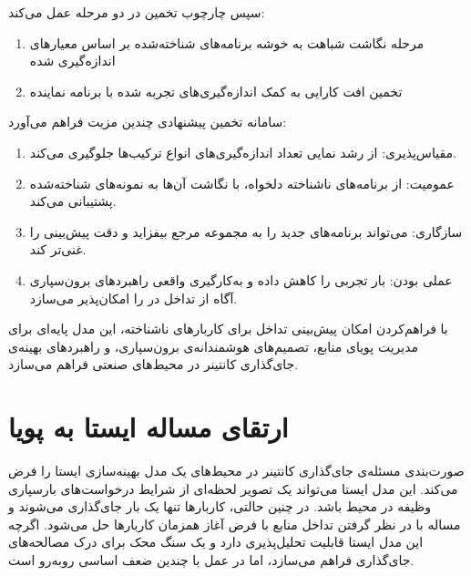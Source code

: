 سپس چارچوب تخمین در دو مرحله عمل می‌کند:

\begin{enumerate}
\item
مرحله نگاشت شباهت به خوشه برنامه‌های شناخته‌شده بر اساس معیارهای اندازه‌گیری شده

\item
تخمین افت کارایی به کمک اندازه‌گیری‌های تجربه شده با برنامه نماینده
\end{enumerate}

سامانه تخمین پیشنهادی چندین مزیت فراهم می‌آورد:

\begin{enumerate}
\item
مقیاس‌پذیری: از رشد نمایی تعداد اندازه‌گیری‌های انواع ترکیب‌ها جلوگیری می‌کند.

\item
عمومیت: از برنامه‌های ناشناخته دلخواه، با نگاشت آن‌ها به نمونه‌های شناخته‌شده پشتیبانی می‌کند.

\item
سازگاری: می‌تواند برنامه‌های جدید را به مجموعه مرجع بیفزاید و دقت پیش‌بینی را غنی‌تر کند.

\item
عملی بودن: بار تجربی را کاهش داده و به‌کارگیری واقعی راهبردهای برون‌سپاری آگاه از تداخل در  را امکان‌پذیر می‌سازد.
\end{enumerate}

با فراهم‌کردن امکان پیش‌بینی تداخل برای کاربارهای ناشناخته، این مدل پایه‌ای برای مدیریت پویای منابع، تصمیم‌های هوشمندانه‌ی برون‌سپاری، و راهبردهای بهینه‌ی جای‌گذاری کانتینر در محیط‌های صنعتی  فراهم می‌سازد.

\section{ارتقای مساله ایستا به پویا}

صورت‌بندی مسئله‌ی جای‌گذاری کانتینر در محیط‌های  یک مدل بهینه‌سازی ایستا را فرض می‌کند. این مدل ایستا می‌تواند یک تصویر لحظه‌ای از شرایط درخواست‌های بارسپاری وظیفه در محیط  باشد. در چنین حالتی، کاربارها تنها یک بار جای‌گذاری می‌شوند و مساله با در نظر گرفتن تداخل منابع با فرض آغاز همزمان کاربارها حل می‌شود. اگرچه این مدل ایستا قابلیت تحلیل‌پذیری دارد و یک سنگ محک برای درک مصالحه‌های جای‌گذاری فراهم می‌سازد، اما در عمل با چندین ضعف اساسی روبه‌رو است.

